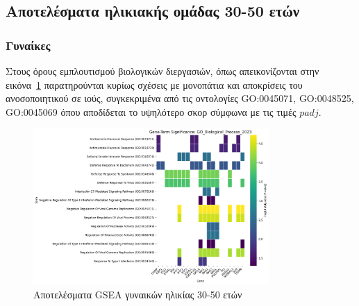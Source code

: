 \documentclass[12pt]{report}
\begin{document}
        \subsection{Αποτελέσματα ηλικιακής ομάδας 30-50 ετών}
            \par
            \subsubsection{Γυναίκες}
                \par
                    Στους όρους εμπλουτισμού βιολογικών διεργασιών, όπως απεικονίζονται στην εικόνα~\ref{fig:gsea_results_Female_30-50_GO_Biological_Process_2023_heatmap} παρατηρούνται κυρίως σχέσεις με μονοπάτια και αποκρίσεις του ανοσοποιητικού σε ιούς, συγκεκριμένα από τις οντολογίες GO:0045071, GO:0048525, GO:0045069 όπου αποδίδεται το υψηλότερο σκορ σύμφωνα με τις τιμές $padj$.
                \begin{figure}[H]
                    \centering
                    \includegraphics[width=0.8\textwidth]{GSEA/Females/30-50/gsea_results_Female_30-50_GO_Biological_Process_2023_heatmap.png}
                    \caption{Αποτελέσματα GSEA γυναικών ηλικίας 30-50 ετών}
                    \label{fig:gsea_results_Female_30-50_GO_Biological_Process_2023_heatmap}
                \end{figure}
\end{document}
